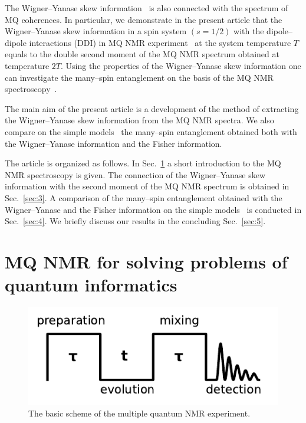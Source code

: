\documentclass[preprint,12pt]{elsarticle}
\begin{document}
The Wigner--Yanase skew information~\cite{1,2,3,4} is also connected with the spectrum of MQ coherences.
In particular, we demonstrate in the present article that the Wigner--Yanase skew information in a spin system $(s = 1/2)$ with the dipole--dipole interactions (DDI) in MQ NMR experiment~\cite{10} at the system temperature $T$ equals to the double second moment of the MQ NMR spectrum obtained at temperature $2T$.
Using the properties of the Wigner--Yanase skew information one can investigate the many--spin entanglement on the basis of the MQ NMR spectroscopy~\cite{10}.


The main aim of the present article is a development of the method of extracting the Wigner--Yanase skew information from the MQ NMR spectra.
We also compare on the simple models~\cite{8,16} the many--spin entanglement obtained both with the Wigner--Yanase information and the Fisher information.


The article is organized as follows.
In Sec.~\ref{sec:2} a short introduction to the MQ NMR spectroscopy is given.
The connection of the Wigner--Yanase skew information with the second moment of the MQ NMR spectrum is obtained in Sec.~\ref{sec:3}.
A comparison of the many--spin entanglement obtained with the Wigner--Yanase and the Fisher information on the simple models~\cite{8,16} is conducted in Sec.~\ref{sec:4}.
We briefly discuss our results in the concluding Sec.~\ref{sec:5}.


\section{MQ NMR for solving problems of quantum informatics}
\label{sec:2}


\begin{figure}
	\includegraphics[width=0.95\linewidth]{mq-experiment}
	\caption{The basic scheme of the multiple quantum NMR experiment.}
	\label{fig:1}
\end{figure}
\end{document}
